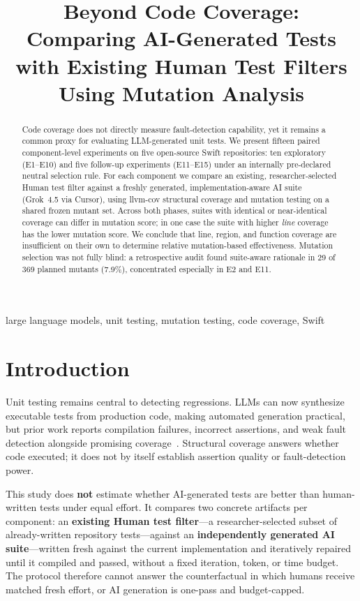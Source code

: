 \documentclass[10pt,conference,a4paper]{IEEEtran}
\title{Beyond Code Coverage: Comparing AI-Generated Tests with Existing Human Test Filters Using Mutation Analysis}
\author{\IEEEauthorblockN{Anonymous Author(s)}
\IEEEauthorblockA{Affiliation withheld for double-blind review}}
\begin{document}
\maketitle

\begin{abstract}
Code coverage does not directly measure fault-detection capability, yet it remains a common proxy for evaluating LLM-generated unit tests. We present fifteen paired component-level experiments on five open-source Swift repositories: ten exploratory (E1--E10) and five follow-up experiments (E11--E15) under an internally pre-declared neutral selection rule. For each component we compare an existing, researcher-selected Human test filter against a freshly generated, implementation-aware AI suite (Grok~4.5 via Cursor), using llvm-cov structural coverage and mutation testing on a shared frozen mutant set. Across both phases, suites with identical or near-identical coverage can differ in mutation score; in one case the suite with higher \emph{line} coverage has the lower mutation score. We conclude that line, region, and function coverage are insufficient on their own to determine relative mutation-based effectiveness. Mutation selection was not fully blind: a retrospective audit found suite-aware rationale in 29 of 369 planned mutants (7.9\%), concentrated especially in E2 and E11.
\end{abstract}

\begin{IEEEkeywords}
large language models, unit testing, mutation testing, code coverage, Swift
\end{IEEEkeywords}

\section{Introduction}
Unit testing remains central to detecting regressions. LLMs can now synthesize executable tests from production code, making automated generation practical, but prior work reports compilation failures, incorrect assertions, and weak fault detection alongside promising coverage~\cite{yuan2023}. Structural coverage answers whether code executed; it does not by itself establish assertion quality or fault-detection power.

This study does \textbf{not} estimate whether AI-generated tests are better than human-written tests under equal effort. It compares two concrete artifacts per component: an \textbf{existing Human test filter}---a researcher-selected subset of already-written repository tests---against an \textbf{independently generated AI suite}---written fresh against the current implementation and iteratively repaired until it compiled and passed, without a fixed iteration, token, or time budget. The protocol therefore cannot answer the counterfactual in which humans receive matched fresh effort, or AI generation is one-pass and budget-capped.
\end{document}
